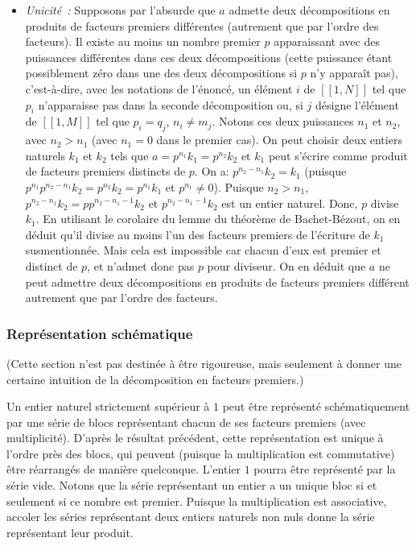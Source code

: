 \begin{itemize}
    \item \textit{Unicité :} 
        Supposons par l'absurde que $a$ admette deux décompositions en produits de facteurs premiers différentes (autrement que par l'ordre des facteurs). 
        Il existe au moins un nombre premier $p$ apparaissant avec des puissances différentes dans ces deux décompositions (cette puissance étant possiblement zéro dans une des deux décompositions si $p$ n'y apparaît pas), c'est-à-dire, avec les notations de l'énoncé, un élément $i$ de $[\![1,N]\!]$ tel que $p_i$ n'apparaisse pas dans la seconde décomposition ou, si $j$ désigne l'élément de $[\![1,M]\!]$ tel que $p_i = q_j$, $n_i \neq m_j$. 
        Notons ces deux puissances $n_1$ et $n_2$, avec $n_2 > n_1$ (avec $n_1 = 0$ dans le premier cas). 
        On peut choisir deux entiers naturels $k_1$ et $k_2$ tels que $a = p^{n_1} k_1 = p^{n_2} k_2$ et $k_1$ peut s'écrire comme produit de facteurs premiers distincts de $p$. 
        On a: $p^{n_2 - n_1} k_2 = k_1$ (puisque $p^{n_1} p^{n_2 - n_1} k_2 = p^{n_2} k_2 = p^{n_1} k_1$ et $p^{n_1} \neq 0$). 
        Puisque $n_2 > n_1$, $p^{n_2 - n_1} k_2 = p p^{n_2 - n_1 - 1} k_2$ et $p^{n_2 - n_1 - 1} k_2$ est un entier naturel.
        Donc, $p$ divise $k_1$. 
        En utilisant le corolaire du lemme du théorème de Bachet-Bézout, on en déduit qu'il divise au moins l'un des facteurs premiers de l'écriture de $k_1$ susmentionnée. 
        Mais cela est impossible car chacun d'eux est premier et distinct de $p$, et n'admet donc pas $p$ pour diviseur.
    On en déduit que $a$ ne peut admettre deux décompositions en produits de facteurs premiers différent autrement que par l'ordre des facteurs.
\end{itemize}

\done

\subsubsection{Représentation schématique}

(Cette section n'est pas destinée à être rigoureuse, mais seulement à donner une certaine intuition de la décomposition en facteurs premiers.)

Un entier naturel strictement supérieur à $1$ peut être représenté schématiquement par une série de blocs représentant chacun de ses facteurs premiers (avec multiplicité). 
D'après le résultat précédent, cette représentation est unique à l'ordre près des blocs, qui peuvent (puisque la multiplication est commutative) être réarrangés de manière quelconque. 
L'entier $1$ pourra être représenté par la série vide.
Notons que la série représentant un entier a un unique bloc si et seulement si ce nombre est premier.
Puisque la multiplication est associative, accoler les séries représentant deux entiers naturels non nuls donne la série représentant leur produit.

